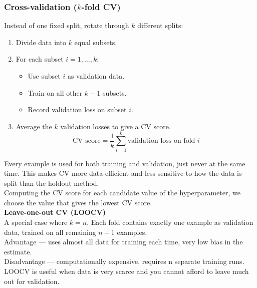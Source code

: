 \documentclass[../Probability.tex]{subfiles}
\begin{document}
\subsubsection{Cross-validation ($k$-fold CV)}
Instead of one fixed split, rotate through $k$ different splits:
\begin{enumerate}
    \item Divide data into $k$ equal subsets.
    \item For each subset $i=1,\ldots,k$:
    \begin{itemize}
        \item Use subset $i$ as validation data.
        \item Train on all other $k-1$ subsets.
        \item Record validation loss on subset $i$.
    \end{itemize}
    \item Average the $k$ validation losses to give a CV score.
    $$\text{CV score} = \frac{1}{k} \sum_{i=1}^{k} \text{validation loss on fold } i$$
\end{enumerate}
Every example is used for both training and validation, just never at the same time. This makes CV more data-efficient and less sensitive to how the data is split than the holdout method.\\
Computing the CV score for each candidate value of the hyperparameter, we choose the value that gives the lowest CV score.\\
\textbf{Leave-one-out CV (LOOCV)}\\
A special case where $k=n$. Each fold contains exactly one example as validation data, trained on all remaining $n-1$ examples.\\
Advantage — uses almost all data for training each time, very low bias in the estimate.\\
Disadvantage — computationally expensive, requires n separate training runs.\\
LOOCV is useful when data is very scarce and you cannot afford to leave much out for validation.\\
\end{document}
